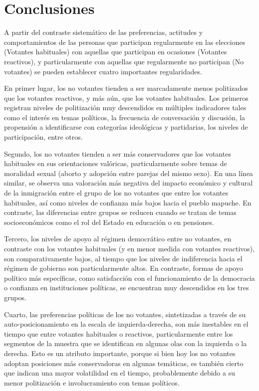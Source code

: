 \documentclass[
  12pt,
]{book}
\begin{document}
\hypertarget{conclusiones}{%
\chapter{Conclusiones}\label{conclusiones}}

A partir del contraste sistemático de las preferencias, actitudes y comportamientos de las personas que participan regularmente en las elecciones (Votantes habituales) con aquellas que participan en ocasiones (Votantes reactivos), y particularmente con aquellas que regularmente no participan (No votantes) se pueden establecer cuatro importantes regularidades.

En primer lugar, los no votantes tienden a ser marcadamente menos politizados que los votantes reactivos, y más aún, que los votantes habituales. Los primeros registran niveles de politización muy descendidos en múltiples indicadores tales como el interés en temas políticos, la frecuencia de conversación y discusión, la propensión a identificarse con categorías ideológicas y partidarias, los niveles de participación, entre otros.

Segundo, los no votantes tienden a ser más conservadores que los votantes habituales en sus orientaciones valóricas, particularmente sobre temas de moralidad sexual (aborto y adopción entre parejas del mismo sexo). En una línea similar, se observa una valoración más negativa del impacto económico y cultural de la inmigración entre el grupo de los no votantes que entre los votantes habituales, así como niveles de confianza más bajos hacia el pueblo mapuche. En contraste, las diferencias entre grupos se reducen cuando se tratan de temas socioeconómicos como el rol del Estado en educación o en pensiones.

Tercero, los niveles de apoyo al régimen democrático entre no votantes, en contraste con los votantes habituales (y en menor medida con votantes reactivos), son comparativamente bajos, al tiempo que los niveles de indiferencia hacia el régimen de gobierno son particularmente altos. En contraste, formas de apoyo político más específicas, como satisfacción con el funcionamiento de la democracia o confianza en instituciones políticas, se encuentran muy descendidos en los tres grupos.

Cuarto, las preferencias políticas de los no votantes, sintetizadas a través de su auto-posicionamiento en la escala de izquierda-derecha, son más inestables en el tiempo que entre votantes habituales o reactivos, particularmente entre los segmentos de la muestra que se identifican en algunas olas con la izquierda o la derecha. Esto es un atributo importante, porque si bien hoy los no votantes adoptan posiciones más conservadoras en algunas temáticas, es también cierto que indican una mayor volatilidad en el tiempo, probablemente debido a su menor politización e involucramiento con temas políticos.
\end{document}
